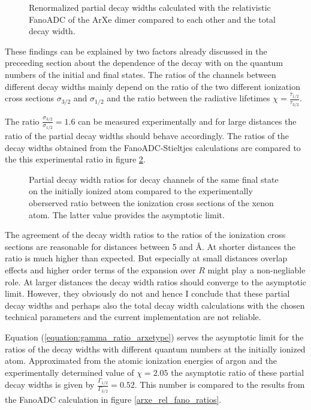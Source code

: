 \begin{figure}[]
  \centering
  
  \caption{Renormalized partial decay widths calculated with the relativistic
           FanoADC of the ArXe dimer compared to each other and the total decay
           width.}
  \label{figure:arxe_rel_fano_partial}
\end{figure}

These findings can be explained by two factors already discussed in the preceeding
section about the dependence of the decay with on the quantum numbers of the
initial and final states. The ratios of the channels between different decay widths
mainly depend on the ratio of the two different ionization cross sections
$\sigma_{3/2}$ and $\sigma_{1/2}$ and the ratio between the radiative lifetimes
$\chi = \frac{\tau_{1/2}}{\tau_{3/2}}$.

The ratio $\frac{\sigma_{3/2}}{\sigma_{1/2}}=1.6$ can be measured experimentally
\cite{} and for large distances the ratio of the partial decay widths should
behave accordingly. The ratios of the decay widths obtained from the
FanoADC-Stieltjes calculations are compared to the this experimental ratio in
figure \ref{figure:arxe_rel_fano_ratios_sigma}.
\begin{figure}[]
  \centering
  
  \caption{Partial decay width ratios for decay channels of the same final
           state on the initially ionized atom compared to the experimentally
           oberserved ratio between the ionization cross sections of the xenon
           atom. The latter value provides the asymptotic limit.}
  \label{figure:arxe_rel_fano_ratios_sigma}
\end{figure}

The agreement of the decay width ratios to the ratios of the ionization cross
sections are reasonable for distances between 5 and \unit[10]{\AA}. At shorter
distances the ratio is much higher than expected. But especially at small distances
overlap effects and higher order terms of the expansion over $R$ might play
a non-negliable role. At larger distances the decay width ratios should converge
to the asymptotic limit. However, they obviously do not and hence I conclude
that these partial decay widths and perhaps also the total decay width calculations
with the chosen technical parameters and the current implementation are not
reliable.

Equation (\ref{equation:gamma_ratio_arxetype}) serves the asymptotic limit
for the ratios of the decay widths with different quantum numbers at the initially
ionized atom. Approximated from the atomic ionization energies of argon and the
experimentally determined value of $\chi = 2.05$ \cite{}
the asymptotic ratio of these partial decay widths is given by
$\frac{\Gamma_{1/2}}{\Gamma_{3/2}} = 0.52$. This number is compared to
the results from the FanoADC calculation in figure \ref{arxe_rel_fano_ratios}.

